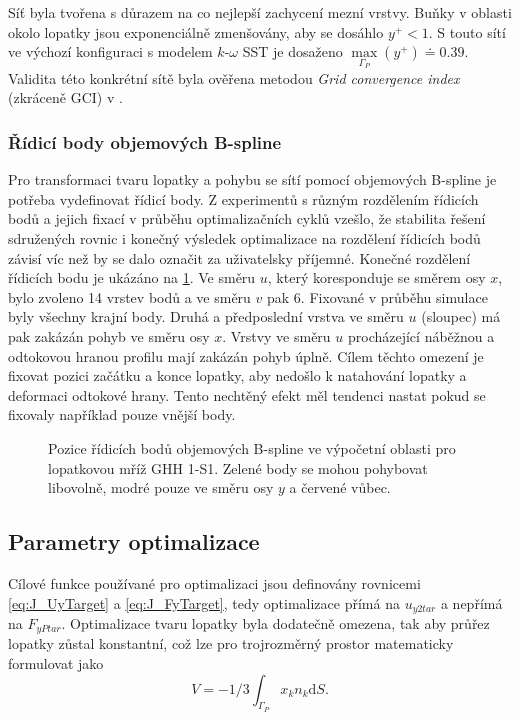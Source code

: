 Síť byla tvořena s důrazem na co nejlepší zachycení mezní vrstvy. Buňky v oblasti okolo lopatky jsou exponenciálně zmenšovány, aby se dosáhlo $ y^+ < 1 $.
S touto sítí ve výchozí konfiguraci s modelem $k\text{-}\omega$ SST je dosaženo $ \max\limits_{\Gamma_P}(y^+) \doteq 0.39 $. Validita této konkrétní sítě byla ověřena metodou \textit{Grid convergence index} (zkráceně GCI) v \cite{tater2021mesh}.


\subsubsection{Řídicí body objemových B-spline}
Pro transformaci tvaru lopatky a pohybu se sítí pomocí objemových B-spline je potřeba vydefinovat řídicí body. Z experimentů s různým rozdělením řídicích bodů a jejich fixací v průběhu optimalizačních cyklů vzešlo, že stabilita řešení sdružených rovnic i konečný výsledek optimalizace na rozdělení řídicích bodů závisí víc než by se dalo označit za uživatelsky příjemné. Konečné rozdělení řídicích bodu je ukázáno na \ref{fig:ghs1_cps}. Ve směru $ u $, který koresponduje se směrem osy $ x $, bylo zvoleno 14 vrstev bodů a ve směru $ v $ pak 6. Fixované v průběhu simulace byly všechny krajní body. Druhá a předposlední vrstva ve směru $ u $ (sloupec) má pak zakázán pohyb ve směru osy $ x $. Vrstvy ve směru $ u $ procházející náběžnou a odtokovou hranou profilu mají zakázán pohyb úplně. Cílem těchto omezení je fixovat pozici začátku a konce lopatky, aby nedošlo k natahování lopatky a deformaci odtokové hrany. Tento nechtěný efekt měl tendenci nastat pokud se fixovaly například pouze vnější body.
\begin{figure}
	\centering
	\def\svgwidth{1\textwidth}
	\graphicspath{{img/inkscape/}}
	
	\caption[Pozice řídicích bodů]{Pozice řídicích bodů objemových B-spline ve výpočetní oblasti pro lopatkovou mříž GHH 1-S1. Zelené body se mohou pohybovat libovolně, modré pouze ve směru osy $ y $ a červené vůbec.}
	\label{fig:ghs1_cps}
\end{figure}


\subsection{Parametry optimalizace}
Cílové funkce používané pro optimalizaci jsou definovány rovnicemi \ref{eq:J_UyTarget} a \ref{eq:J_FyTarget}, tedy optimalizace přímá na $ u_{y2tar} $ a nepřímá na $ F_{yPtar} $. Optimalizace tvaru lopatky byla dodatečně omezena, tak aby průřez lopatky zůstal konstantní, což lze pro trojrozměrný prostor matematicky formulovat jako
\begin{equation} 
V=-1/3\int_{\Gamma_P}x_kn_k\mathrm{d}S.
\end{equation}

